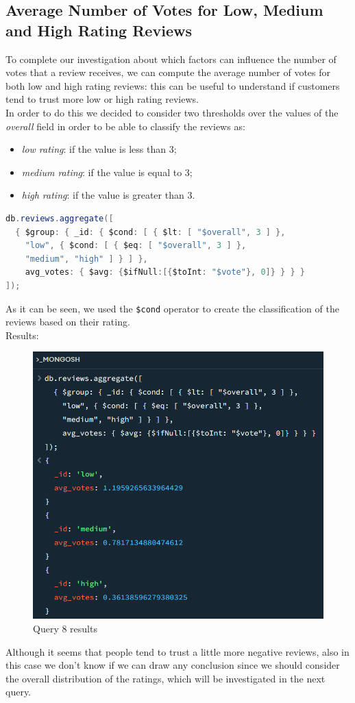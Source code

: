 \newpage
\subsection{Average Number of Votes for Low, Medium and High Rating Reviews}
To complete our investigation about which factors can influence the number of votes that a review receives, we can compute the average number of votes for both low and high rating reviews: this can be useful to understand if customers tend to trust more low or high rating reviews. \\
In order to do this we decided to consider two thresholds over the values of the \textit{overall} field in order to be able to classify the reviews as:
\begin{itemize}
    \item \textit{low rating}: if the value is less than 3;
    \item \textit{medium rating}: if the value is equal to 3;
    \item \textit{high rating}: if the value is greater than 3.
\end{itemize}
\begin{lstlisting}[language=Java]
db.reviews.aggregate([
  { $group: { _id: { $cond: [ { $lt: [ "$overall", 3 ] }, 
    "low", { $cond: [ { $eq: [ "$overall", 3 ] }, 
    "medium", "high" ] } ] }, 
    avg_votes: { $avg: {$ifNull:[{$toInt: "$vote"}, 0]} } } }
]);
\end{lstlisting}
As it can be seen, we used the \texttt{\$cond} operator to create the classification of the reviews based on their rating. \\
Results:
\begin{figure}[H]
  \centering
  \includegraphics[scale=0.55]{Images/q8_result.png}
  \caption{Query 8 results}
  \label{fig:q8_result}
\end{figure}
Although it seems that people tend to trust a little more negative reviews, also in this case we don't know if we can draw any conclusion since we should consider the overall distribution of the ratings, which will be investigated in the next query.

